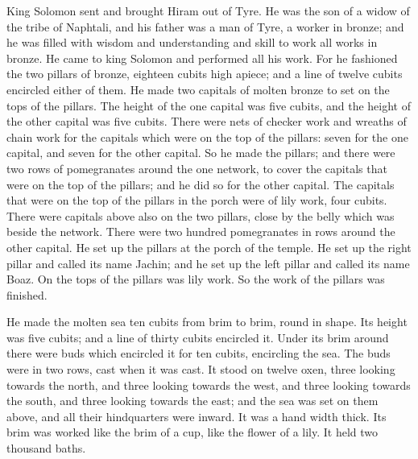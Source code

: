  King Solomon sent and brought Hiram out of Tyre.
 He was the son of a widow of the tribe of Naphtali, and
his father was a man of Tyre, a worker in bronze; and he was filled with
wisdom and understanding and skill to work all works in bronze. He came
to king Solomon and performed all his work.  For he
fashioned the two pillars of bronze, eighteen cubits high apiece; and a
line of twelve cubits encircled either of them.  He made
two capitals of molten bronze to set on the tops of the pillars. The
height of the one capital was five cubits, and the height of the other
capital was five cubits.  There were nets of checker work
and wreaths of chain work for the capitals which were on the top of the
pillars: seven for the one capital, and seven for the other capital.
 So he made the pillars; and there were two rows of
pomegranates around the one network, to cover the capitals that were on
the top of the pillars; and he did so for the other capital.
 The capitals that were on the top of the pillars in the
porch were of lily work, four cubits.  There were capitals
above also on the two pillars, close by the belly which was beside the
network. There were two hundred pomegranates in rows around the other
capital.  He set up the pillars at the porch of the temple.
He set up the right pillar and called its name Jachin; and he set up the
left pillar and called its name Boaz.  On the tops of the
pillars was lily work. So the work of the pillars was finished.

 He made the molten sea ten cubits from brim to brim, round
in shape. Its height was five cubits; and a line of thirty cubits
encircled it.  Under its brim around there were buds which
encircled it for ten cubits, encircling the sea. The buds were in two
rows, cast when it was cast.  It stood on twelve oxen,
three looking towards the north, and three looking towards the west, and
three looking towards the south, and three looking towards the east; and
the sea was set on them above, and all their hindquarters were inward.
 It was a hand width thick. Its brim was worked like the
brim of a cup, like the flower of a lily. It held two thousand baths.

